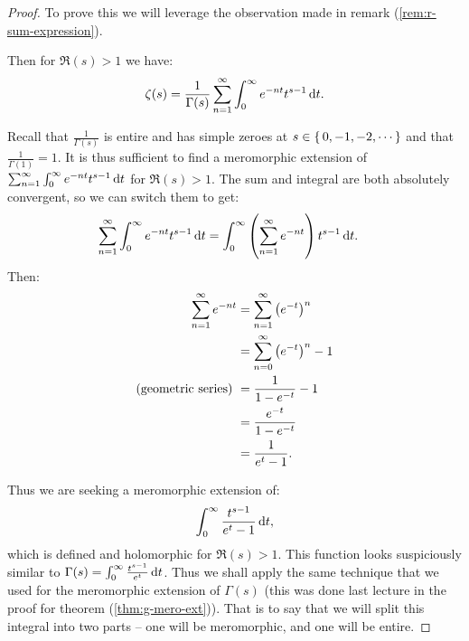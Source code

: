 \begin{proof}
To prove this we will leverage the observation made in remark (\ref{rem:r-sum-expression}).

Then for $\Re(s) > 1$ we have:
\begin{align*}
    \zeta(s) = \frac{1}{\Gamma(s) } \sum_{n=1}^\infty \int_0^\infty e^{-nt} t^{s-1} \dif t.
\end{align*}

Recall that $\frac{1}{\Gamma(s) }$ is entire and has simple zeroes at $s \in \set{0,-1,-2, \cdots}$ and that $\frac{1}{\Gamma(1)} = 1$. It is thus sufficient to find a meromorphic extension of $\sum_{n=1}^\infty \int_0^\infty e^{-nt} t^{s-1} \dif t$ for $\Re(s) > 1$. The sum and integral are both absolutely convergent, so we can switch them to get:
\begin{align*}
    \sum_{n=1}^\infty \int_0^\infty e^{-nt} t^{s-1} \dif t &= \int_0^\infty \br{\sum_{n=1}^\infty  e^{-nt} } t^{s-1} \dif t.
\end{align*}
Then:
\begin{align*}
    \sum_{n=1}^\infty  e^{-nt} &= \sum_{n=1}^\infty  \left( e^{-t} \right)^n\\
    &=\sum_{n=0}^\infty  \left( e^{-t} \right)^n - 1\\
    \text{(geometric series) }&= \frac{1}{1-e^{-t}} - 1\\
    &= \frac{e^{-t}}{1-e^{-t}}\\
    &= \frac{1}{e^t - 1}.
\end{align*}


Thus we are seeking a meromorphic extension of:
\begin{align*}
    \int_0^\infty \frac{t^{s-1}}{e^t - 1}  \dif t,
\end{align*}
which is defined and holomorphic for $\Re(s) > 1$. This function looks suspiciously similar to $\Gamma(s) = \int_0^\infty \frac{t^{s-1}}{e^t }  \dif t$. Thus we shall apply the same technique that we used for the meromorphic extension of $\Gamma(s)$ (this was done last lecture in the proof for theorem (\ref{thm:g-mero-ext})). That is to say that we will split this integral into two parts -- one will be meromorphic, and one will be entire.


\end{proof}
